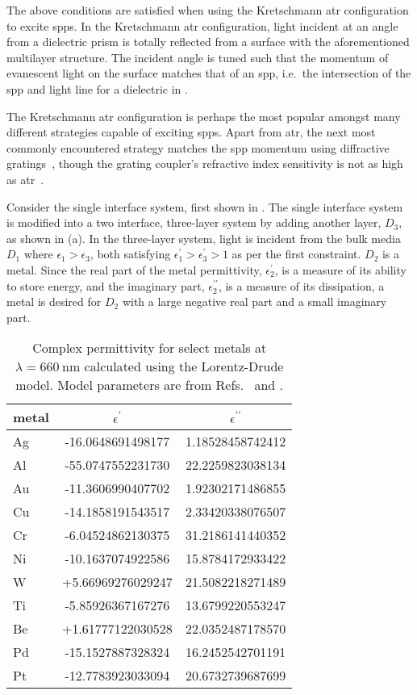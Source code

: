 The above conditions are satisfied when using the Kretschmann \gls{atr}
configuration to excite \glspl{spp}.  In the Kretschmann \gls{atr} configuration, light
incident at an angle from a dielectric prism is totally reflected from a
surface with the aforementioned multilayer structure.  The incident angle
is tuned such that the momentum of evanescent light on the surface matches
that of an \gls{spp}, i.e.\ the intersection of the \gls{spp} and light line
for a dielectric in .

The Kretschmann \gls{atr} configuration is perhaps the most popular amongst many
different strategies capable of exciting \glspl{spp}.  Apart from \gls{atr}, the next
most commonly encountered strategy matches the \gls{spp} momentum using
diffractive gratings~\cite{homola1999surface}, though the grating coupler's
refractive index sensitivity is not as high as
\gls{atr}~\cite{homola1999senscomparison}.

Consider the single interface system, first shown in
.  The single interface system is modified
into a two interface, three-layer system by adding another layer, $D_3$, as
shown in (a).  In the three-layer system,
light is incident from the bulk media $D_1$ where $\epsilon_1>\epsilon_3$,
both satisfying $\epsilon^\prime_1>\epsilon^\prime_3>1$ as per the first
constraint.  $D_2$ is a metal.  Since the real part of the metal
permittivity, $\epsilon_2^\prime$, is a measure of its ability to store
energy, and the imaginary part, $\epsilon_2^{\prime\prime}$, is a measure of
its dissipation, a metal is desired for $D_2$ with a large negative real
part and a small imaginary part.
\begin{table}[ht]
\centering
{}
\begin{tabular}{lSS}
\toprule
metal & {$\epsilon^\prime$} & {$\epsilon^{\prime\prime}$} \\
\midrule
Ag & -16.0648691498177 & 1.18528458742412\\
Al & -55.0747552231730 & 22.2259823038134\\
Au & -11.3606990407702 & 1.92302171486855\\
Cu & -14.1858191543517 & 2.33420338076507\\
Cr & -6.04524862130375 & 31.2186141440352\\
Ni & -10.1637074922586 & 15.8784172933422\\
W  & +5.66969276029247 & 21.5082218271489\\
Ti & -5.85926367167276 & 13.6799220553247\\
Be & +1.61777122030528 & 22.0352487178570\\
Pd & -15.1527887328324 & 16.2452542701191\\
Pt & -12.7783923033094 & 20.6732739687699\\
\bottomrule
\end{tabular}
\caption{Complex permittivity for select metals at
$\lambda=\SI{660}{\nano\meter}$ calculated using the Lorentz-Drude
model.  Model parameters are from Refs.~\cite{ung2007interference} and
\cite{rakic1998optical}.}
\label{tbl:epsmetal600}
\end{table}


